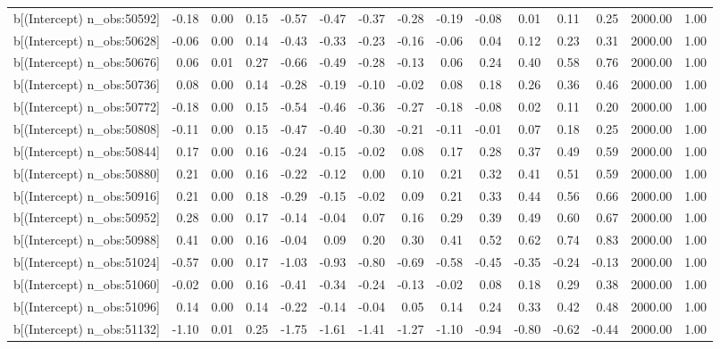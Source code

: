\begin{table}[ht]
\begin{tabular}{rrrrrrrrrrrrrrr}
  b[(Intercept) n\_obs:50592] & -0.18 & 0.00 & 0.15 & -0.57 & -0.47 & -0.37 & -0.28 & -0.19 & -0.08 & 0.01 & 0.11 & 0.25 & 2000.00 & 1.00 \\ 
  b[(Intercept) n\_obs:50628] & -0.06 & 0.00 & 0.14 & -0.43 & -0.33 & -0.23 & -0.16 & -0.06 & 0.04 & 0.12 & 0.23 & 0.31 & 2000.00 & 1.00 \\ 
  b[(Intercept) n\_obs:50676] & 0.06 & 0.01 & 0.27 & -0.66 & -0.49 & -0.28 & -0.13 & 0.06 & 0.24 & 0.40 & 0.58 & 0.76 & 2000.00 & 1.00 \\ 
  b[(Intercept) n\_obs:50736] & 0.08 & 0.00 & 0.14 & -0.28 & -0.19 & -0.10 & -0.02 & 0.08 & 0.18 & 0.26 & 0.36 & 0.46 & 2000.00 & 1.00 \\ 
  b[(Intercept) n\_obs:50772] & -0.18 & 0.00 & 0.15 & -0.54 & -0.46 & -0.36 & -0.27 & -0.18 & -0.08 & 0.02 & 0.11 & 0.20 & 2000.00 & 1.00 \\ 
  b[(Intercept) n\_obs:50808] & -0.11 & 0.00 & 0.15 & -0.47 & -0.40 & -0.30 & -0.21 & -0.11 & -0.01 & 0.07 & 0.18 & 0.25 & 2000.00 & 1.00 \\ 
  b[(Intercept) n\_obs:50844] & 0.17 & 0.00 & 0.16 & -0.24 & -0.15 & -0.02 & 0.08 & 0.17 & 0.28 & 0.37 & 0.49 & 0.59 & 2000.00 & 1.00 \\ 
  b[(Intercept) n\_obs:50880] & 0.21 & 0.00 & 0.16 & -0.22 & -0.12 & 0.00 & 0.10 & 0.21 & 0.32 & 0.41 & 0.51 & 0.59 & 2000.00 & 1.00 \\ 
  b[(Intercept) n\_obs:50916] & 0.21 & 0.00 & 0.18 & -0.29 & -0.15 & -0.02 & 0.09 & 0.21 & 0.33 & 0.44 & 0.56 & 0.66 & 2000.00 & 1.00 \\ 
  b[(Intercept) n\_obs:50952] & 0.28 & 0.00 & 0.17 & -0.14 & -0.04 & 0.07 & 0.16 & 0.29 & 0.39 & 0.49 & 0.60 & 0.67 & 2000.00 & 1.00 \\ 
  b[(Intercept) n\_obs:50988] & 0.41 & 0.00 & 0.16 & -0.04 & 0.09 & 0.20 & 0.30 & 0.41 & 0.52 & 0.62 & 0.74 & 0.83 & 2000.00 & 1.00 \\ 
  b[(Intercept) n\_obs:51024] & -0.57 & 0.00 & 0.17 & -1.03 & -0.93 & -0.80 & -0.69 & -0.58 & -0.45 & -0.35 & -0.24 & -0.13 & 2000.00 & 1.00 \\ 
  b[(Intercept) n\_obs:51060] & -0.02 & 0.00 & 0.16 & -0.41 & -0.34 & -0.24 & -0.13 & -0.02 & 0.08 & 0.18 & 0.29 & 0.38 & 2000.00 & 1.00 \\ 
  b[(Intercept) n\_obs:51096] & 0.14 & 0.00 & 0.14 & -0.22 & -0.14 & -0.04 & 0.05 & 0.14 & 0.24 & 0.33 & 0.42 & 0.48 & 2000.00 & 1.00 \\ 
  b[(Intercept) n\_obs:51132] & -1.10 & 0.01 & 0.25 & -1.75 & -1.61 & -1.41 & -1.27 & -1.10 & -0.94 & -0.80 & -0.62 & -0.44 & 2000.00 & 1.00 \\ 

\end{tabular}
\end{table}
